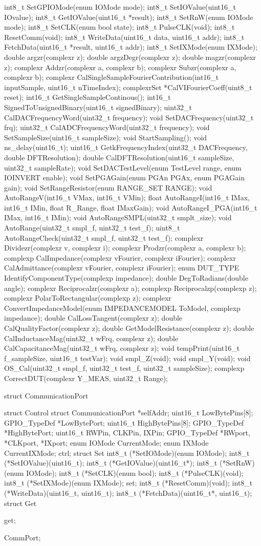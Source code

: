 int8_t SetGPIOMode(enum IOMode mode);
int8_t SetIOValue(uint16_t IOvalue);
int8_t GetIOValue(uint16_t *result);
int8_t SetRnW(enum IOMode mode);
int8_t SetCLK(enum bool state);
int8_t PulseCLK(void);
int8_t ResetComm(void);
int8_t WriteData(uint16_t data, uint16_t addr);
int8_t FetchData(uint16_t *result, uint16_t addr);
int8_t SetIXMode(enum IXMode);
double argzr(complexr z);
double argzDegr(complexr z);
double magzr(complexr z);
complexr Addzr(complexr a, complexr b);
complexr Subzr(complexr a, complexr b);
complexr CalSingleSampleFourierContribution(int16_t inputSample, uint16_t nTimeIndex);
complexrSet *CalVIFourierCoeff(uint8_t reset);
int16_t GetSingleSampleContinous();
int16_t SignedToUnsignedBinary(uint16_t signedBinary);
uint32_t CalDACFrequencyWord(uint32_t frequency);
void SetDACFrequency(uint32_t frq);
uint32_t CalADCFrequencyWord(uint32_t frequency);
void SetSampleSize(uint16_t sampleSize);
void StartSampling();
void ns_delay(uint16_t);
uint16_t GetkFrequencyIndex(uint32_t DACFrequency, double DFTResolution);
double CalDFTResolution(uint16_t sampleSize, uint32_t sampleRate);
void SetDACTestLevel(enum TestLevel range, enum IOINVERT enable);
void SetPGAGain(enum PGAn PGAx, enum PGAGain gain);
void SetRangeResistor(enum RANGE_SET RANGE);
void AutoRangeV(int16_t VMax, int16_t VMin);
float AutoRangeI(int16_t IMax, int16_t IMin, float R_Range, float IMaxGain);
void AutoRangeI_PGA(int16_t IMax, int16_t IMin);
void AutoRangeSMPL(uint32_t smplt_size);
void AutoRange(uint32_t smpl_f, uint32_t test_f);
uint8_t AutoRangeCheck(uint32_t smpl_f, uint32_t test_f);
complexr Dividezr(complexr v, complexr i);
complexr Prodzr(complexr a, complexr b);
complexp CalImpedance(complexr vFourier, complexr iFourier);
complexr CalAdmittance(complexr vFourier, complexr iFourier);
enum DUT_TYPE IdentifyComponentType(complexp impedance);
double DegToRadians(double angle);
complexr Reciprocalzr(complexr a);
complexp Reciprocalzp(complexp z);
complexr PolarToRectangular(complexp z);
complexr ConvertImpedanceModel(enum IMPEDANCEMODEL ToModel, complexp impedance);
double CalLossTangent(complexr z);
double CalQualityFactor(complexr z);
double GetModelResistance(complexr z);
double CalInductanceMag(uint32_t wFrq, complexr z);
double CalCapacitanceMag(uint32_t wFrq, complexr z);
void tempPrint(uint16_t f_sampleSize, uint16_t testVar);
void smpl_Z(void);
void smpl_Y(void);
void OS_Cal(uint32_t smpl_f, uint32_t test_f, uint32_t sampleSize);
complexp CorrectDUT(complexr Y_MEAS, uint32_t Range);

struct CommunicationPort{
	struct Control{
		struct CommunicationPort *selfAddr;
		uint16_t LowBytePins[8];
		GPIO_TypeDef *LowBytePort;
		uint16_t HighBytePins[8];
		GPIO_TypeDef *HighBytePort;
		uint16_t RWPin, CLKPin, IXPin;
		GPIO_TypeDef *RWport, *CLKport, *IXport;
		enum IOMode CurrentMode;
		enum IXMode CurrentIXMode;
	}ctrl;
	struct Set{
		int8_t (*SetIOMode)(enum IOMode);
		int8_t (*SetIOValue)(uint16_t);
		int8_t (*GetIOValue)(uint16_t*);
		int8_t (*SetRnW)(enum IOMode);
		int8_t (*SetCLK)(enum bool);
		int8_t (*PulseCLK)(void);
		int8_t (*SetIXMode)(enum IXMode);
	}set;
	int8_t (*ResetComm)(void);
	int8_t (*WriteData)(uint16_t, uint16_t);
	int8_t (*FetchData)(uint16_t*, uint16_t);
	struct Get{

	}get;
}CommPort;

